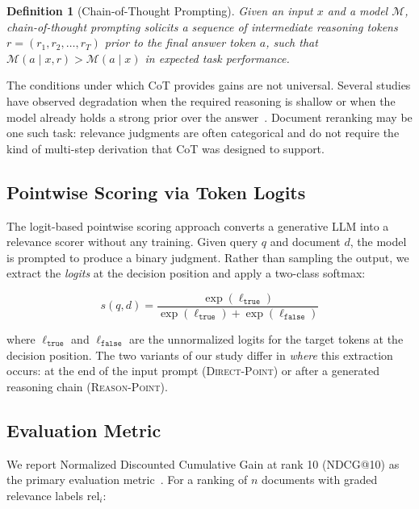 \documentclass[12pt]{article}
\makeatletter
\newtheorem{definition}{Definition}
\newcommand{\ndcg}{NDCG@10}
\newcommand{\direct}{\textsc{Direct-Point}}
\newcommand{\reason}{\textsc{Reason-Point}}
\newcommand{\CoT}{CoT}
\makeatother
\begin{document}
\begin{definition}[Chain-of-Thought Prompting]
  Given an input $x$ and a model $\mathcal{M}$, chain-of-thought prompting
  solicits a sequence of intermediate reasoning tokens
  $r = (r_1, r_2, \ldots, r_T)$ prior to the final answer token $a$, such
  that $\mathcal{M}(a \mid x, r) > \mathcal{M}(a \mid x)$ in expected task
  performance.
\end{definition}

The conditions under which \CoT{} provides gains are not universal.  Several
studies have observed degradation when the required reasoning is shallow or
when the model already holds a strong prior over the answer~\citep{kadavath2022language}.
Document reranking may be one such task: relevance judgments are often
categorical and do not require the kind of multi-step derivation that \CoT{}
was designed to support.

\subsection{Pointwise Scoring via Token Logits}

The logit-based pointwise scoring approach converts a generative LLM into a
relevance scorer without any training.  Given query $q$ and document $d$, the
model is prompted to produce a binary judgment.  Rather than sampling the output,
we extract the \emph{logits} at the decision position and apply a two-class
softmax:

\begin{equation}
  s(q, d) = \frac{\exp\!\left(\ell_{\texttt{true}}\right)}
                 {\exp\!\left(\ell_{\texttt{true}}\right)
                  + \exp\!\left(\ell_{\texttt{false}}\right)}
  \label{eq:score}
\end{equation}

\noindent
where $\ell_{\texttt{true}}$ and $\ell_{\texttt{false}}$ are the unnormalized
logits for the target tokens at the decision position.  The two variants of our
study differ in \emph{where} this extraction occurs: at the end of the input
prompt (\direct{}) or after a generated reasoning chain (\reason{}).

\subsection{Evaluation Metric}

We report Normalized Discounted Cumulative Gain at rank 10 (\ndcg{}) as the
primary evaluation metric~\citep{jarvelin2002cumulated}.  For a ranking of
$n$ documents with graded relevance labels $\mathrm{rel}_i$:
\end{document}
